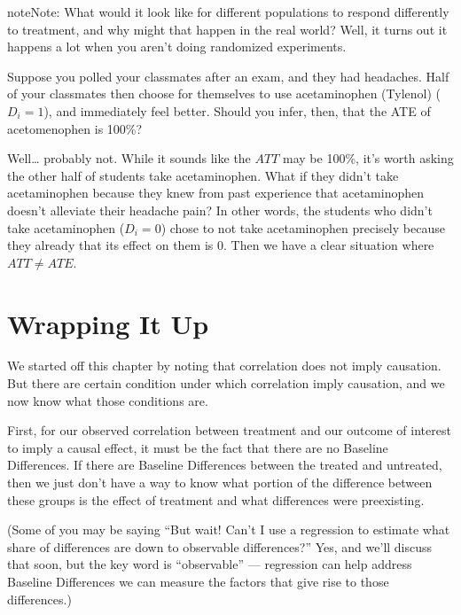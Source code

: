 \documentclass[letterpaper,10pt,english]{jupyterBook}
\begin{document}
\begin{sphinxadmonition}{note}{Note:}
\sphinxAtStartPar
What would it look like for different populations to respond differently to treatment, and why might that happen in the real world? Well, it turns out it happens a lot when you aren’t doing randomized experiments.

\sphinxAtStartPar
Suppose you polled your classmates after an exam, and they  had headaches. Half of your classmates then choose for themselves to use acetaminophen (Tylenol) (\(D_i=1\)), and immediately feel better. Should you infer, then, that the ATE of acetomenophen is 100\%?

\sphinxAtStartPar
Well… probably not. While it sounds like the \(ATT\) may be 100\%, it’s worth asking  the other half of students  take acetaminophen. What if they didn’t take acetaminophen because they knew from past experience that acetaminophen doesn’t alleviate their headache pain? In other words, the students who didn’t take acetaminophen (\(D_i = 0\)) chose to not take acetaminophen precisely because they already  that its effect on them is 0. Then we have a clear situation where \(ATT \neq ATE\).
\end{sphinxadmonition}


\section{Wrapping It Up}
\label{\detokenize{35_causal/10_potential_outcomes:wrapping-it-up}}
\sphinxAtStartPar
We started off this chapter by noting that correlation does not  imply causation. But there are certain condition under which correlation  imply causation, and we now know what those conditions are.

\sphinxAtStartPar
First, for our observed correlation between treatment and our outcome of interest to imply a causal effect, it must be the fact that there are no Baseline Differences. If there are Baseline Differences between the treated and untreated, then we just don’t have a way to know what portion of the difference between these groups is the effect of treatment and what differences were pre\sphinxhyphen{}existing.

\sphinxAtStartPar
(Some of you may be saying “But wait! Can’t I use a regression to estimate what share of differences are down to observable differences?” Yes, and we’ll discuss that soon, but the key word is “observable” — regression can help address Baseline Differences  we can measure the factors that give rise to those differences.)
\end{document}
